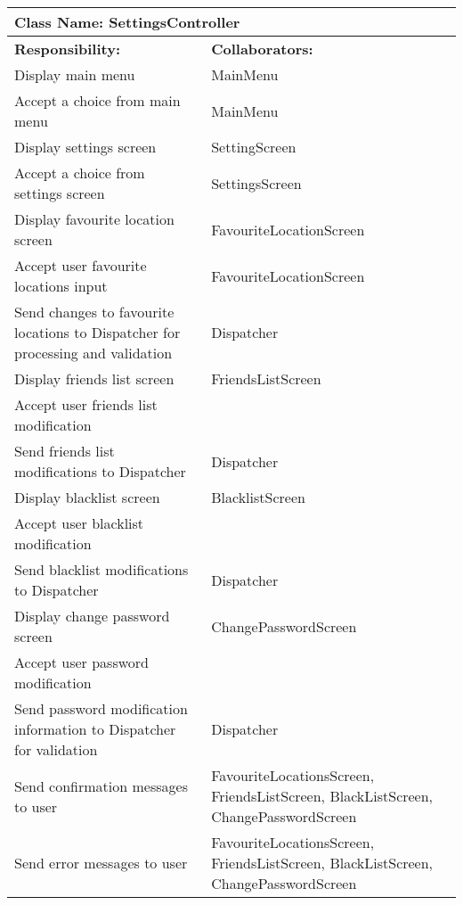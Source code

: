 \documentclass[english]{article}
\begin{document}
    \begin{table}[!ht]
        \centering
        \begin{tabular}{|p{8cm}|p{4cm}|}
        \hline 
        \multicolumn{2}{|l|}{\textbf{Class Name: SettingsController}} \\
        \hline
        \textbf{Responsibility:} & \textbf{Collaborators:} \\
        \hline
        Display main menu & MainMenu\\
        \hline 
        Accept a choice from main menu & MainMenu \\
        \hline
        Display settings screen & SettingScreen \\
        \hline
        Accept a choice from settings screen & SettingsScreen \\
        \hline
        Display favourite location screen & FavouriteLocationScreen \\
        \hline
        Accept user favourite locations input & FavouriteLocationScreen\\
        \hline
        Send changes to favourite locations to Dispatcher for processing and validation & Dispatcher \\
        \hline
        Display friends list screen & FriendsListScreen \\
        \hline
        Accept user friends list modification & \\
        \hline
        Send friends list modifications to Dispatcher & Dispatcher \\
        \hline
         Display blacklist screen & BlacklistScreen \\
        \hline
        Accept user blacklist modification & \\
        \hline
        Send blacklist modifications to Dispatcher & Dispatcher \\
        \hline
        Display change password screen & ChangePasswordScreen \\
        \hline
        Accept user password modification &  \\
        \hline
        Send password modification information to Dispatcher for validation & Dispatcher\\
        \hline
        Send confirmation messages to user & FavouriteLocationsScreen, FriendsListScreen, BlackListScreen, ChangePasswordScreen \\
        \hline
        Send error messages to user & FavouriteLocationsScreen, FriendsListScreen, BlackListScreen, ChangePasswordScreen \\
        \hline
        \end{tabular}
    \end{table}
    
\end{document}
